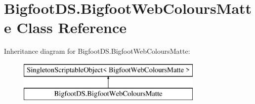 \hypertarget{class_bigfoot_d_s_1_1_bigfoot_web_colours_matte}{}\section{Bigfoot\+D\+S.\+Bigfoot\+Web\+Colours\+Matte Class Reference}
\label{class_bigfoot_d_s_1_1_bigfoot_web_colours_matte}
Inheritance diagram for Bigfoot\+D\+S.\+Bigfoot\+Web\+Colours\+Matte\+:\begin{figure}[H]
\begin{center}
\leavevmode
\includegraphics[height=2.000000cm]{class_bigfoot_d_s_1_1_bigfoot_web_colours_matte}
\end{center}
\end{figure}

